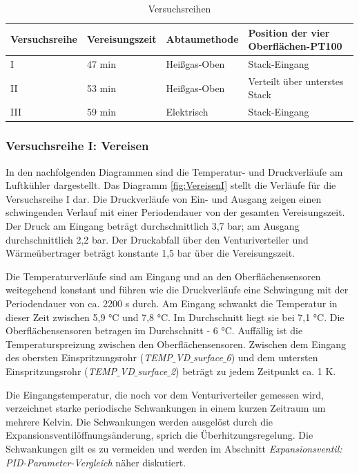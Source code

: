 \begin{table}[htb]
\centering
\caption{Versuchsreihen}\vspace{6pt}
\begin{tabular}{llll}
\hline 
\textbf{Versuchsreihe} & \textbf{Vereisungszeit} & \textbf{Abtaumethode} & \textbf{Position der vier Oberflächen-PT100} \\ 
\hline 
\hline 
I & 47 min  & Heißgas-Oben & Stack-Eingang \\ 
\hline 
II & 53 min  & Heißgas-Oben & Verteilt über unterstes Stack \\ 
\hline 
III & 59 min & Elektrisch & Stack-Eingang \\ 
\hline 
\hline 
\end{tabular} 
\label{tab:Versuchsreihe}
\end{table}


\subsubsection*{Versuchsreihe I: Vereisen}


In den nachfolgenden Diagrammen sind die Temperatur- und Druckverläufe am Luftkühler dargestellt. Das Diagramm \ref{fig:VereisenI} stellt die Verläufe für die Versuchsreihe I dar. Die Druckverläufe von Ein- und Ausgang zeigen einen schwingenden Verlauf mit einer Periodendauer von der gesamten Vereisungszeit. Der Druck am Eingang beträgt durchschnittlich 3,7 bar; am Ausgang durchschnittlich 2,2 bar. Der Druckabfall über den Venturiverteiler und Wärmeübertrager beträgt konstante 1,5 bar über die Vereisungszeit. 

Die Temperaturverläufe sind am Eingang und an den Oberflächensensoren weitegehend konstant und führen wie die Druckverläufe eine Schwingung mit der Periodendauer von ca. 2200 s durch. Am Eingang schwankt die Temperatur in dieser Zeit zwischen 5,9 °C und 7,8 °C. Im Durchschnitt liegt sie bei 7,1 °C. Die Oberflächensensoren betragen im Durchschnitt - 6 °C. Auffällig ist die Temperaturspreizung zwischen den Oberflächensensoren. Zwischen dem Eingang des obersten Einspritzungsrohr (\textit{TEMP$\_$VD$\_$surface$\_$6}) und dem untersten Einspritzungsrohr (\textit{TEMP$\_$VD$\_$surface$\_$2}) beträgt zu jedem Zeitpunkt ca. 1 K. 

Die Eingangstemperatur, die noch vor dem Venturiverteiler gemessen wird, verzeichnet starke periodische Schwankungen in einem kurzen Zeitraum um mehrere Kelvin. Die Schwankungen werden ausgelöst durch die Expansionsventilöffnungsänderung, sprich die Überhitzungsregelung.  Die Schwankungen gilt es zu vermeiden und werden im Abschnitt \textit{Expansionsventil: PID-Parameter-Vergleich} näher diskutiert. 

